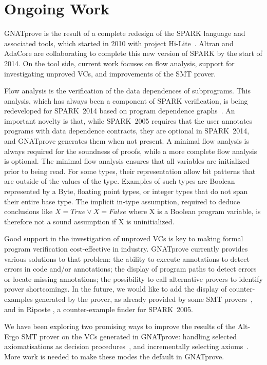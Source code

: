 \documentclass[sttt,final]{svjour}
\newcommand{\hilite}{Hi-Lite}
\newcommand{\gnatprove}{GNATprove\xspace}
\newcommand{\oldspark}{SPARK~2005\xspace}
\newcommand{\newspark}{SPARK~2014\xspace}
\begin{document}
\section{Ongoing Work}
\label{ongoing}

\gnatprove is the result of a complete redesign of the SPARK language and
associated tools, which started in 2010 with project \hilite\ \cite{Hi-Lite}.
Altran and AdaCore are collaborating to complete this new version of SPARK by
the start of 2014. On the tool side, current work focuses on flow analysis,
support for investigating unproved VCs, and improvements of the SMT prover.

Flow analysis is the verification of the data dependences of
subprograms. This analysis, which has always been a component of SPARK
verification, is being redeveloped for \newspark based on program
dependence graphs~\cite{horwitz:1988:pldi}. An important novelty is
that, while \oldspark requires that the user annotates programs with
data dependence contracts, they are optional in \newspark, and
\gnatprove generates them when not present. A minimal flow analysis is
always required for the soundness of proofs, while a more complete
flow analysis is optional. The minimal flow analysis ensures that all
variables are initialized prior to being read. For some types, their
representation allow bit patterns that are outside of the values of
the type. Examples of such types are Boolean represented by a Byte,
floating point types, or integer types that do not span their entire
base type. The implicit in-type assumption, required to deduce
conclusions like $X = True \lor X = False$ where X is a Boolean
program variable, is therefore not a sound assumption if X is
uninitialized.

Good support in the investigation of unproved VCs is key to making
formal program verification cost-effective in industry. \gnatprove
currently provides various solutions to that problem: the ability to
execute annotations to detect errors in code and/or annotations; the
display of program paths to detect errors or locate missing
annotations; the possibility to call alternative provers to identify
prover shortcomings. In the future, we would like to add the display
of counter-examples generated by the prover, as already provided by
some SMT provers~\cite{CVC3,Z3model}, and in Riposte
\cite{riposteICLP}, a counter-example finder for \oldspark.

We have been exploring two promising ways to improve the results of the
Alt-Ergo SMT prover on the VCs generated in \gnatprove: handling selected
axiomatisations as decision procedures~\cite{dross:2012:smt}, and incrementally
selecting axioms~\cite{cgs09:ipo,kuhlwein:2012:ijcar}. More work is needed to
make these modes the default in \gnatprove.
\end{document}
